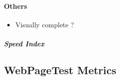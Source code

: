 \paragraph{Others}



\begin{itemize}
\item Visually complete ?
\end{itemize}


\subparagraph{Speed Index}















\subsection{WebPageTest Metrics}



